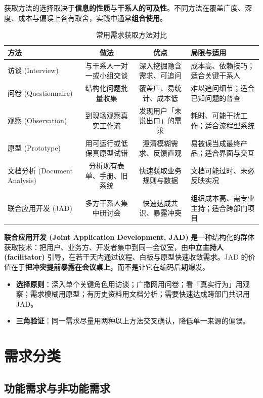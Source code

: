 获取方法的选择取决于\textbf{信息的性质}与\textbf{干系人的可及性}。不同方法在覆盖广度、深度、成本与偏误上各有取舍，实践中通常\textbf{组合使用}。

\begin{table}[H]
\centering
\caption{常用需求获取方法对比}
\begin{tabulary}{\textwidth}{LCCL}
\toprule
方法 & 做法 & 优点 & 局限与适用 \\
\midrule
访谈 (Interview) & 与干系人一对一或小组交谈 & 深入挖掘隐含需求、可追问 & 成本高、依赖技巧；适合关键干系人 \\
问卷 (Questionnaire) & 结构化问题批量收集 & 覆盖广、易统计、成本低 & 难以追问细节；适合已知问题的普查 \\
观察 (Observation) & 到现场观察真实工作流 & 发现用户「未说出口」的需求 & 耗时、可能干扰工作；适合流程型系统 \\
原型 (Prototype) & 用可运行或低保真原型试错 & 澄清模糊需求、反馈直观 & 易被误当成最终产品；适合界面与交互 \\
文档分析 (Document Analysis) & 分析现有表单、手册、旧系统 & 快速获取业务规则与数据 & 文档可能过时、未必反映实况 \\
联合应用开发 (JAD) & 多方干系人集中研讨会 & 快速达成共识、暴露冲突 & 组织成本高、需专业主持；适合跨部门项目 \\
\bottomrule
\end{tabulary}
\end{table}

\textbf{联合应用开发 (Joint Application Development, JAD)} 是一种结构化的群体获取技术：把用户、业务方、开发者集中到同一会议室，由\textbf{中立主持人 (facilitator)} 引导，在若干天内通过议程、白板与原型快速收敛需求。JAD 的价值在于\textbf{把冲突提前暴露在会议桌上}，而不是让它在编码后期爆发。

\begin{itemize}
    \item \textbf{选择原则}：深入单个关键角色用访谈；广撒网用问卷；看「真实行为」用观察；需求模糊用原型；有历史资料用文档分析；需要快速达成跨部门共识用 JAD。
    \item \textbf{三角验证}：同一需求尽量用两种以上方法交叉确认，降低单一来源的偏误。
\end{itemize}

\section{需求分类}

\subsection{功能需求与非功能需求}

